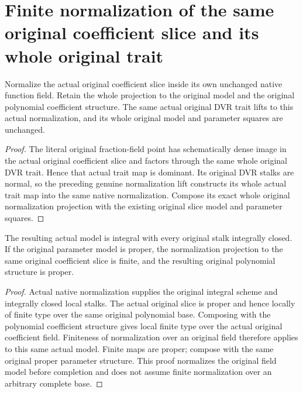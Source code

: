 \section{Finite normalization of the same original coefficient slice and its whole original trait}
\begin{definition}\label{def:scheme-coefficient-slice-normalization}
Normalize the actual original coefficient slice inside its own unchanged native function field. Retain the whole projection to the original model and the original polynomial coefficient structure. The same actual original DVR trait lifts to this actual normalization, and its whole original model and parameter squares are unchanged.
\leanok
\end{definition}
\begin{proof}
The literal original fraction-field point has schematically dense image in the actual original coefficient slice and factors through the same whole original DVR trait. Hence that actual trait map is dominant. Its original DVR stalks are normal, so the preceding genuine normalization lift constructs its whole actual trait map into the same native normalization. Compose its exact whole original normalization projection with the existing original slice model and parameter squares.
\end{proof}
\begin{theorem}\label{thm:scheme-coefficient-slice-normalization-finite}
The resulting actual model is integral with every original stalk integrally closed. If the original parameter model is proper, the normalization projection to the same original coefficient slice is finite, and the resulting original polynomial structure is proper.
\leanok
\end{theorem}
\begin{proof}
Actual native normalization supplies the original integral scheme and integrally closed local stalks. The actual original slice is proper and hence locally of finite type over the same original polynomial base. Composing with the polynomial coefficient structure gives local finite type over the actual original coefficient field. Finiteness of normalization over an original field therefore applies to this same actual model. Finite maps are proper; compose with the same original proper parameter structure. This proof normalizes the original field model before completion and does not assume finite normalization over an arbitrary complete base.
\end{proof}

